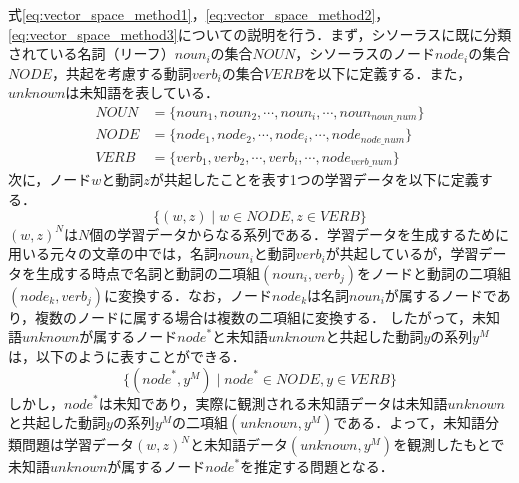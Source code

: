 \documentclass[japanese]{jnlp_1.4}
\begin{document}
式\ref{eq:vector_space_method1}，\ref{eq:vector_space_method2}，\ref{eq:vector_space_method3}についての説明を行う．まず，シソーラスに既に分類されている名詞（リーフ）$\mathit{noun}_i$の集合$\mathit{NOUN}$，シソーラスのノード$\mathit{node}_i$の集合$\mathit{NODE}$，共起を考慮する動詞$\mathit{verb}_i$の集合$\mathit{VERB}$を以下に定義する．また，$\mathit{unknown}$は未知語を表している．
\begin{align*}
 \mathit{NOUN} & =\{\mathit{noun}_1, \mathit{noun}_2, \cdots, \mathit{noun}_i, \cdots, \mathit{noun}_{\mathit{noun}\_\mathit{num}} \} \\
 \mathit{NODE} & =\{\mathit{node}_1, \mathit{node}_2, \cdots, \mathit{node}_i, \cdots, \mathit{node}_{\mathit{node}\_\mathit{num}} \} \\
 \mathit{VERB} & =\{\mathit{verb}_1, \mathit{verb}_2, \cdots, \mathit{verb}_i, \cdots, \mathit{node}_{\mathit{verb}\_\mathit{num}} \} 
\end{align*}
次に，ノード$w$と動詞$z$が共起したことを表す1つの学習データを以下に定義する．
\[
 \{ (w,z) \mid w{\in}\mathit{NODE}, z{\in}\mathit{VERB} \} 
\]
$(w,z)^N$は$N$個の学習データからなる系列である．学習データを生成するために用いる元々の文章の中では，名詞$\mathit{noun}_i$と動詞$\mathit{verb}_i$が共起しているが，学習データを生成する時点で名詞と動詞の二項組$(\mathit{noun}_i, \mathit{verb}_j)$をノードと動詞の二項組$(\mathit{node}_k, \mathit{verb}_j)$に変換する．なお，ノード$\mathit{node}_k$は名詞$\mathit{noun}_i$が属するノードであり，複数のノードに属する場合は複数の二項組に変換する．
したがって，未知語$\mathit{unknown}$が属するノード$\mathit{node}^*$と未知語$\mathit{unknown}$と共起した動詞$y$の系列$y^M$は，以下のように表すことができる．
\[
 \{ (\mathit{node}^*, y^M) \mid \mathit{node}^* {\in} \mathit{NODE}, y {\in} \mathit{VERB} \} 
\]
しかし，$\mathit{node}^*$は未知であり，実際に観測される未知語データは未知語$\mathit{unknown}$と共起した動詞$y$の系列$y^M$の二項組$(\mathit{unknown}, y^M)$である．よって，未知語分類問題は学習データ$(w,z)^N$と未知語データ$(\mathit{unknown}, y^M)$を観測したもとで未知語$\mathit{unknown}$が属するノード$\mathit{node}^*$を推定する問題となる．
\end{document}
